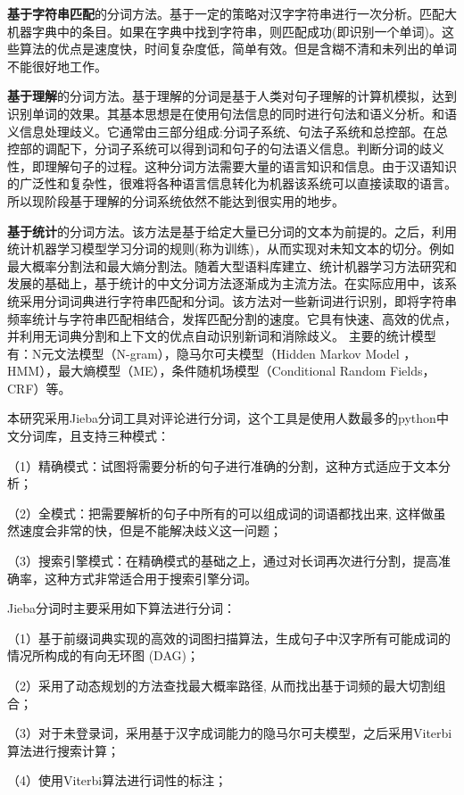 \documentclass[cs4size,a4paper]{ctexart}
\numberwithin{equation}{section}
\numberwithin{table}{section}
\numberwithin{figure}{section}
\begin{document}
\textbf{基于字符串匹配}的分词方法。基于一定的策略对汉字字符串进行一次分析。匹配大机器字典中的条目。如果在字典中找到字符串，则匹配成功(即识别一个单词)。这些算法的优点是速度快，时间复杂度低，简单有效。但是含糊不清和未列出的单词不能很好地工作。

\textbf{基于理解}的分词方法。基于理解的分词是基于人类对句子理解的计算机模拟，达到识别单词的效果。其基本思想是在使用句法信息的同时进行句法和语义分析。和语义信息处理歧义。它通常由三部分组成:分词子系统、句法子系统和总控部。在总控部的调配下，分词子系统可以得到词和句子的句法语义信息。判断分词的歧义性，即理解句子的过程。这种分词方法需要大量的语言知识和信息。由于汉语知识的广泛性和复杂性，很难将各种语言信息转化为机器该系统可以直接读取的语言。所以现阶段基于理解的分词系统依然不能达到很实用的地步。

\textbf{基于统计}的分词方法。该方法是基于给定大量已分词的文本为前提的。之后，利用统计机器学习模型学习分词的规则(称为训练)，从而实现对未知文本的切分。例如最大概率分割法和最大熵分割法。随着大型语料库建立、统计机器学习方法研究和发展的基础上，基于统计的中文分词方法逐渐成为主流方法。在实际应用中，该系统采用分词词典进行字符串匹配和分词。该方法对一些新词进行识别，即将字符串频率统计与字符串匹配相结合，发挥匹配分割的速度。它具有快速、高效的优点，并利用无词典分割和上下文的优点自动识别新词和消除歧义。
主要的统计模型有：N元文法模型（N-gram），隐马尔可夫模型（Hidden Markov Model ，HMM），最大熵模型（ME），条件随机场模型（Conditional Random Fields，CRF）等。


本研究采用Jieba分词工具对评论进行分词，这个工具是使用人数最多的python中文分词库，且支持三种模式：

（1）精确模式：试图将需要分析的句子进行准确的分割，这种方式适应于文本分析；

（2）全模式：把需要解析的句子中所有的可以组成词的词语都找出来, 这样做虽然速度会非常的快，但是不能解决歧义这一问题；

（3）搜索引擎模式：在精确模式的基础之上，通过对长词再次进行分割，提高准确率，这种方式非常适合用于搜索引擎分词。

Jieba分词时主要采用如下算法进行分词：

（1）基于前缀词典实现的高效的词图扫描算法，生成句子中汉字所有可能成词的情况所构成的有向无环图 (DAG)；

（2）采用了动态规划的方法查找最大概率路径, 从而找出基于词频的最大切割组合；

（3）对于未登录词，采用基于汉字成词能力的隐马尔可夫模型，之后采用Viterbi算法进行搜索计算；

（4）使用Viterbi算法进行词性的标注；
\end{document}
